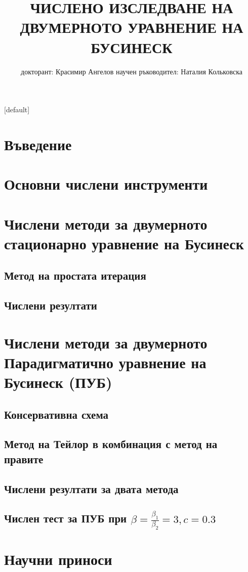 \documentclass{beamer}
\begin{document}
\title{ЧИСЛЕНО ИЗСЛЕДВАНЕ НА\\ ДВУМЕРНОТО УРАВНЕНИЕ НА БУСИНЕСК}
\author{докторант: Красимир Ангелов 
\newline \newline научен ръководител: Наталия Кольковска}


\begin{frame}
\titlepage
\end{frame}

\begin{frame}
\tableofcontents 
{}[default]
\section{Въведение}
\section{Основни числени инструменти}
\section{Числени методи за двумерното стационарно уравнение на Бусинеск}
\subsection{Метод на простата итерация}
\subsection{Числени резултати}
\section{Числени методи за двумерното Парадигматично уравнение на Бусинеск (ПУБ)}
\subsection{Консервативна схема}
\subsection{Метод на Тейлор в комбинация с метод на правите}
\subsection{Числени резултати за двата метода}
\subsection{Числен тест за ПУБ при $\beta = \frac{\beta_1}{\beta_2} = 3, c=0.3$}
\section{Научни приноси}
\end{frame}
\end{document}
